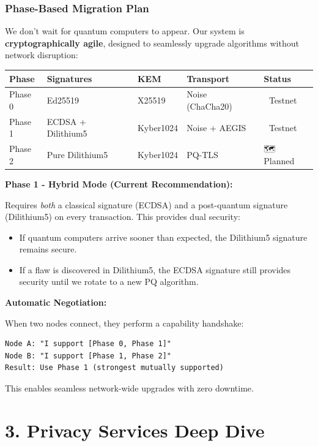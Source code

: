 \documentclass[11pt,a4paper]{article}
\begin{document}
\subsubsection{Phase-Based Migration Plan}

We don't wait for quantum computers to appear. Our system is \textbf{cryptographically agile}, designed to seamlessly upgrade algorithms without network disruption:

\begin{table}[h]
\centering
\begin{tabular}{lllll}
\toprule
\textbf{Phase} & \textbf{Signatures} & \textbf{KEM} & \textbf{Transport} & \textbf{Status} \\
\midrule
Phase 0 & Ed25519 & X25519 & Noise (ChaCha20) & 🔬 Testnet \\
Phase 1 & ECDSA + Dilithium5 & Kyber1024 & Noise + AEGIS & 🔬 Testnet \\
Phase 2 & Pure Dilithium5 & Kyber1024 & PQ-TLS & 🗺️ Planned \\
\bottomrule
\end{tabular}
\end{table}

\textbf{Phase 1 - Hybrid Mode (Current Recommendation):}

Requires \textit{both} a classical signature (ECDSA) and a post-quantum signature (Dilithium5) on every transaction. This provides dual security:
\begin{itemize}
    \item If quantum computers arrive sooner than expected, the Dilithium5 signature remains secure.
    \item If a flaw is discovered in Dilithium5, the ECDSA signature still provides security until we rotate to a new PQ algorithm.
\end{itemize}

\textbf{Automatic Negotiation:}

When two nodes connect, they perform a capability handshake:
\begin{verbatim}
Node A: "I support [Phase 0, Phase 1]"
Node B: "I support [Phase 1, Phase 2]"
Result: Use Phase 1 (strongest mutually supported)
\end{verbatim}

This enables seamless network-wide upgrades with zero downtime.

\section{3. Privacy Services Deep Dive}
\end{document}
